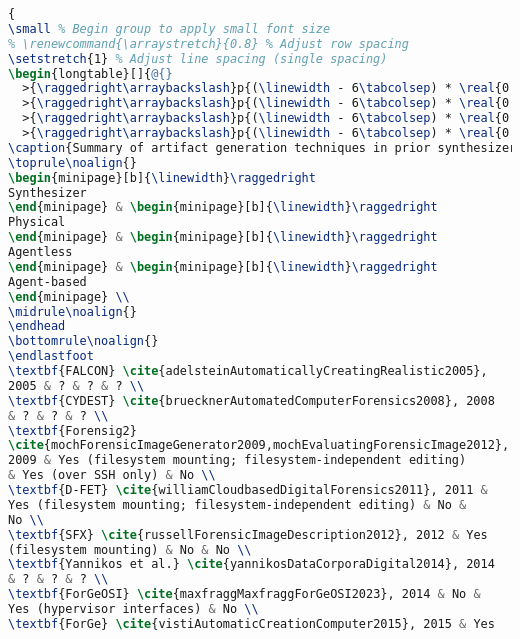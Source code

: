 \begin{lstlisting}[language=TeX]
{
\small % Begin group to apply small font size
% \renewcommand{\arraystretch}{0.8} % Adjust row spacing
\setstretch{1} % Adjust line spacing (single spacing)
\begin{longtable}[]{@{}
  >{\raggedright\arraybackslash}p{(\linewidth - 6\tabcolsep) * \real{0.20}}
  >{\raggedright\arraybackslash}p{(\linewidth - 6\tabcolsep) * \real{0.2666}}
  >{\raggedright\arraybackslash}p{(\linewidth - 6\tabcolsep) * \real{0.2666}}
  >{\raggedright\arraybackslash}p{(\linewidth - 6\tabcolsep) * \real{0.2666}}@{}}
\caption{Summary of artifact generation techniques in prior synthesizers}\label{table:prior-techniques} \\
\toprule\noalign{}
\begin{minipage}[b]{\linewidth}\raggedright
Synthesizer
\end{minipage} & \begin{minipage}[b]{\linewidth}\raggedright
Physical
\end{minipage} & \begin{minipage}[b]{\linewidth}\raggedright
Agentless
\end{minipage} & \begin{minipage}[b]{\linewidth}\raggedright
Agent-based
\end{minipage} \\
\midrule\noalign{}
\endhead
\bottomrule\noalign{}
\endlastfoot
\textbf{FALCON} \cite{adelsteinAutomaticallyCreatingRealistic2005},
2005 & ? & ? & ? \\
\textbf{CYDEST} \cite{bruecknerAutomatedComputerForensics2008}, 2008
& ? & ? & ? \\
\textbf{Forensig2}
\cite{mochForensicImageGenerator2009,mochEvaluatingForensicImage2012},
2009 & Yes (filesystem mounting; filesystem-independent editing)
& Yes (over SSH only) & No \\
\textbf{D-FET} \cite{williamCloudbasedDigitalForensics2011}, 2011 &
Yes (filesystem mounting; filesystem-independent editing) & No &
No \\
\textbf{SFX} \cite{russellForensicImageDescription2012}, 2012 & Yes
(filesystem mounting) & No & No \\
\textbf{Yannikos et al.} \cite{yannikosDataCorporaDigital2014}, 2014
& ? & ? & ? \\
\textbf{ForGeOSI} \cite{maxfraggMaxfraggForGeOSI2023}, 2014 & No &
Yes (hypervisor interfaces) & No \\
\textbf{ForGe} \cite{vistiAutomaticCreationComputer2015}, 2015 & Yes

\end{lstlisting}
